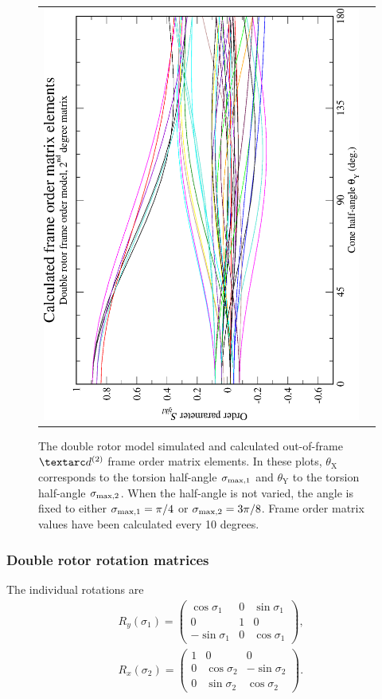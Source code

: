 \begin{figure}
\begin{tabular}{@{}cc@{}}
    \includegraphics[width=.35\textwidth,angle=270]{images/frame_order_matrix/Sijkl_double_rotor_out_of_frame_theta_y_calc.eps} \\
  \end{tabular}
  \caption[Double rotor simulated and calculated out-of-frame $\FOtwo$ elements.]{
    The double rotor model simulated and calculated out-of-frame $\FOtwo$ frame order matrix elements.
    In these plots, $\theta_\textrm{X}$ corresponds to the torsion half-angle $\sigma_{\textrm{max,1}}$ and $\theta_\textrm{Y}$ to the torsion half-angle $\sigma_{\textrm{max,2}}$.
    When the half-angle is not varied, the angle is fixed to either $\sigma_{\textrm{max,1}} = \pi/4$ or $\sigma_{\textrm{max,2}} = 3\pi/8$.
    Frame order matrix values have been calculated every 10 degrees.
  }
  \label{fig: simulated and calculated out-of-frame 2nd degree double rotor frame order}
\end{figure}


\subsubsection{Double rotor rotation matrices}

The individual rotations are
\begin{subequations}
\begin{align}
    &R_y(\sigma_1) =
        \begin{pmatrix}
             \cos\sigma_1 & 0 & \sin\sigma_1 \\
             0 &            1 & 0 \\
            -\sin\sigma_1 & 0 & \cos\sigma_1
        \end{pmatrix}, \\
    &R_x(\sigma_2) =
        \begin{pmatrix}
            1 & 0            &  0 \\
            0 & \cos\sigma_2 & -\sin\sigma_2 \\
            0 & \sin\sigma_2 &  \cos\sigma_2
        \end{pmatrix}.
\end{align}
\end{subequations}

